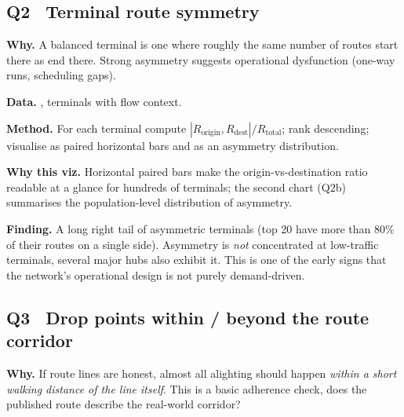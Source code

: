 
\subsection{Q2 \textbullet\ Terminal route symmetry}

\textbf{Why.} A balanced terminal is one where roughly the same number
of routes start there as end there. Strong asymmetry suggests
operational dysfunction (one-way runs, scheduling gaps).

\textbf{Data.} , terminals with
flow context.

\textbf{Method.} For each terminal compute
$|R_\text{origin}, R_\text{dest}| / R_\text{total}$; rank descending;
visualise as paired horizontal bars and as an asymmetry distribution.


\textbf{Why this viz.} Horizontal paired bars make the
origin-vs-destination ratio readable at a glance for hundreds of
terminals; the second chart (Q2b) summarises the population-level
distribution of asymmetry.

\textbf{Finding.} A long right tail of asymmetric terminals (top 20
have more than 80\% of their routes on a single side). Asymmetry is
\emph{not} concentrated at low-traffic terminals, several major hubs
also exhibit it. This is one of the early signs that the network's
operational design is not purely demand-driven.


\subsection{Q3 \textbullet\ Drop points within / beyond the route corridor}

\textbf{Why.} If route lines are honest, almost all alighting should
happen \emph{within a short walking distance of the line itself}. This
is a basic adherence check, does the published route describe the
real-world corridor?

